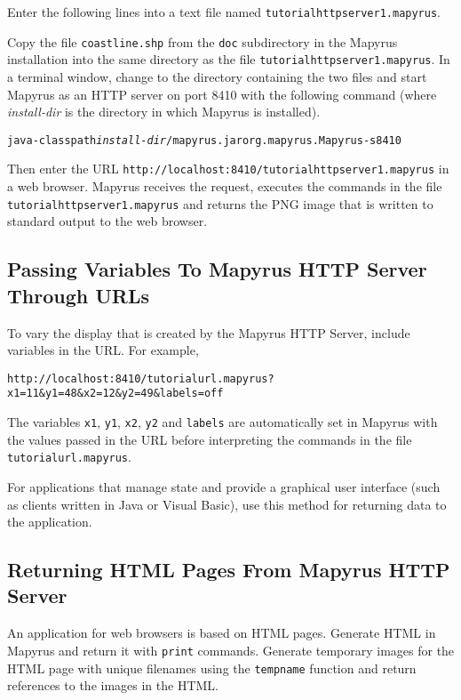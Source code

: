 Enter the following lines into a text file named
\texttt{tutorialhttpserver1.mapyrus}.



Copy the file \texttt{coastline.shp} from the \texttt{doc} subdirectory in the
Mapyrus installation into the same directory as the file
\texttt{tutorialhttpserver1.mapyrus}.  In a terminal window, change to the
directory containing the two files and start Mapyrus as an HTTP server on port
8410 with the following command
(where \textit{install-dir} is the directory in which Mapyrus is installed).

\begin{alltt}
java -classpath \textit{install-dir}/mapyrus.jar org.mapyrus.Mapyrus -s 8410
\end{alltt}

Then enter the URL \texttt{http://localhost:8410/tutorialhttpserver1.mapyrus} in a
web browser.  Mapyrus receives the request, executes the commands in the file
\texttt{tutorialhttpserver1.mapyrus} and returns the PNG image that is written to
standard output to the web browser.

\subsection{Passing Variables To Mapyrus HTTP Server Through URLs}

To vary the display that is created by the Mapyrus HTTP Server, include
variables in the URL.  For example,

\begin{verbatim}
http://localhost:8410/tutorialurl.mapyrus?x1=11&y1=48&x2=12&y2=49&labels=off
\end{verbatim}

The variables \texttt{x1}, \texttt{y1}, \texttt{x2}, \texttt{y2}
and \texttt{labels} are automatically set in Mapyrus with the values
passed in the URL before interpreting
the commands in the file \texttt{tutorialurl.mapyrus}.

For applications that manage state
and provide a graphical user interface (such as clients written in
Java or Visual Basic), use this method for returning data to the
application.

\subsection{Returning HTML Pages From Mapyrus HTTP Server}

An application for web browsers is based on HTML pages.
Generate HTML in Mapyrus and return it with \texttt{print} commands.
Generate temporary images for the HTML page with
unique filenames using the
\texttt{tempname}
function and return references to the images in the HTML.

